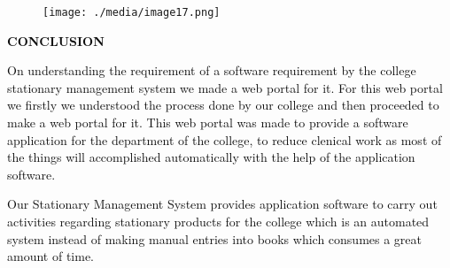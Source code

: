 \documentclass[12pt]{report}
\renewcommand{\_}{\kern-1.5pt\textunderscore\kern-1.5pt}
\begin{document}

\begin{figure}[H]
\advance\leftskip 2.71in		\texttt{[image: ./media/image17.png]}
\end{figure}



\par


\vspace{\baselineskip}

\vspace{\baselineskip}
 \tabto{0.59in} 
\vspace{\baselineskip}
\vspace{\baselineskip}

\vspace{\baselineskip}

\vspace{\baselineskip}

\vspace{\baselineskip}

\vspace{\baselineskip}
{\fontsize{24pt}{28.8pt}\selectfont \textbf{\textcolor[HTML]{0D0D0D}{CONCLUSION}}\par}\par


\vspace{\baselineskip}

\vspace{\baselineskip}
\vspace{\baselineskip}

\vspace{\baselineskip}
\begin{justify}
\textcolor[HTML]{0D0D0D}{On understanding the requirement of a software requirement by the college stationary management system we made a web portal for it. For this web portal we firstly we understood the process done by our college and then proceeded to make a web portal for it. This web portal was made to provide a software application for the department of the college, to reduce clenical work as most of the things will accomplished automatically with the help of the application software. }
\end{justify}\par

\begin{justify}
\textcolor[HTML]{0D0D0D}{Our Stationary Management System provides application software to carry out activities regarding stationary products for the college which is an automated system instead of making manual entries into books which consumes a great amount of time.}
\end{justify}\par
\end{document}
